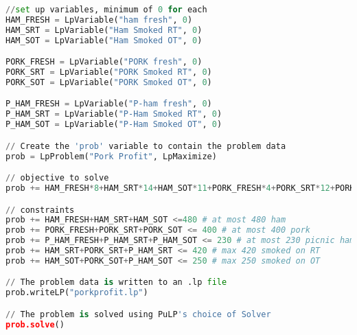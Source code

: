 \documentclass[11pt,letterpaper]{article}
\begin{document}
\begin{lstlisting}[language=python,caption={Code to solve linear program},mathescape]
//set up variables, minimum of 0 for each
HAM_FRESH = LpVariable("ham fresh", 0)
HAM_SRT = LpVariable("Ham Smoked RT", 0)
HAM_SOT = LpVariable("Ham Smoked OT", 0)

PORK_FRESH = LpVariable("PORK fresh", 0)
PORK_SRT = LpVariable("PORK Smoked RT", 0)
PORK_SOT = LpVariable("PORK Smoked OT", 0)

P_HAM_FRESH = LpVariable("P-ham fresh", 0)
P_HAM_SRT = LpVariable("P-Ham Smoked RT", 0)
P_HAM_SOT = LpVariable("P-Ham Smoked OT", 0)

// Create the 'prob' variable to contain the problem data
prob = LpProblem("Pork Profit", LpMaximize)

// objective to solve
prob += HAM_FRESH*8+HAM_SRT*14+HAM_SOT*11+PORK_FRESH*4+PORK_SRT*12+PORK_SOT*7+P_HAM_FRESH*4+P_HAM_SRT*13+P_HAM_SOT*9

// constraints
prob += HAM_FRESH+HAM_SRT+HAM_SOT <=480 # at most 480 ham
prob += PORK_FRESH+PORK_SRT+PORK_SOT <= 400 # at most 400 pork
prob += P_HAM_FRESH+P_HAM_SRT+P_HAM_SOT <= 230 # at most 230 picnic ham
prob += HAM_SRT+PORK_SRT+P_HAM_SRT <= 420 # max 420 smoked on RT
prob += HAM_SOT+PORK_SOT+P_HAM_SOT <= 250 # max 250 smoked on OT

// The problem data is written to an .lp file
prob.writeLP("porkprofit.lp")

// The problem is solved using PuLP's choice of Solver
prob.solve()

\end{lstlisting}
\end{document}
